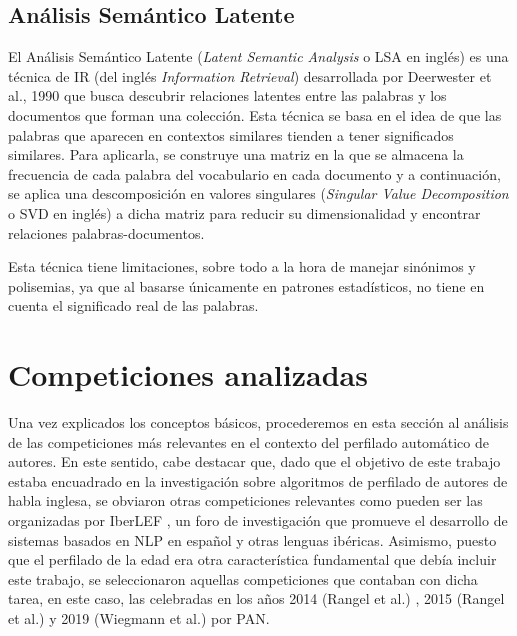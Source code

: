\subsection{Análisis Semántico Latente}
\label{sec:analisis_semantico_latente}

El Análisis Semántico Latente (\textit{Latent Semantic Analysis} o LSA en inglés) es una técnica de IR (del inglés \textit{Information Retrieval}) desarrollada por Deerwester et al., 1990 \cite{deerwester1990indexing}
que busca descubrir relaciones latentes
entre las palabras y los documentos que forman una colección. Esta técnica se basa
en el idea de que las palabras que aparecen en contextos similares
tienden a tener significados similares. Para aplicarla, se construye una matriz en la que se almacena la frecuencia de cada palabra del vocabulario en cada documento y
a continuación, se aplica una descomposición en valores singulares (\textit{Singular Value Decomposition} o SVD en inglés) a dicha matriz para reducir su dimensionalidad
y encontrar relaciones palabras-documentos.

\bigskip
Esta técnica tiene limitaciones, sobre todo a la hora de manejar sinónimos y polisemias, ya que al basarse únicamente en patrones estadísticos,
no tiene en cuenta el significado real de las palabras.

\section{Competiciones analizadas}
\label{sec:competiciones_analizadas}

Una vez explicados los conceptos básicos, procederemos en esta sección al análisis de las competiciones más relevantes en el contexto
del perfilado automático de autores. En este sentido, cabe destacar que, dado que el objetivo de este trabajo estaba encuadrado en
la investigación sobre algoritmos de perfilado de autores de habla inglesa, se obviaron otras competiciones relevantes como pueden ser
las organizadas por IberLEF \cite{iberlef}, un foro de investigación que promueve el desarrollo de sistemas basados en NLP en español y otras
lenguas ibéricas.
Asimismo, puesto que el perfilado de la edad era otra característica fundamental que debía incluir este trabajo, se seleccionaron aquellas competiciones
que contaban con dicha tarea, en este caso, las celebradas en los años 2014 (Rangel et al.) \cite{rangel2014overview}, 2015 (Rangel et al.) \cite{rangel2015overview} y 2019 (Wiegmann et al.) \cite{wiegmann2019overview}
por PAN.

